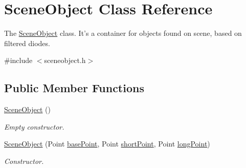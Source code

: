 \hypertarget{classSceneObject}{\section{\-Scene\-Object \-Class \-Reference}
\label{classSceneObject}
}


\-The \hyperlink{classSceneObject}{\-Scene\-Object} class. \-It's a container for objects found on scene, based on filtered diodes.  




{\ttfamily \#include $<$sceneobject.\-h$>$}

\subsection*{\-Public \-Member \-Functions}
\begin{DoxyCompactItemize}
\item 
\hypertarget{classSceneObject_a0d268d96d77dbeb45b07a6442e2f4d0d}{\hyperlink{classSceneObject_a0d268d96d77dbeb45b07a6442e2f4d0d}{\-Scene\-Object} ()}\label{classSceneObject_a0d268d96d77dbeb45b07a6442e2f4d0d}

\begin{DoxyCompactList}\small\item\em \-Empty constructor. \end{DoxyCompactList}\item 
\hyperlink{classSceneObject_a0bbd4971b6fd3b3ad2ea35ec14e6a617}{\-Scene\-Object} (\-Point \hyperlink{classSceneObject_a2b8c4779bd48231183257d0470c32f67}{base\-Point}, \-Point \hyperlink{classSceneObject_a11385bdb16c8fe6136484078bee1fb61}{short\-Point}, \-Point \hyperlink{classSceneObject_a78c848200dc2f5baa59393547e6f7259}{long\-Point})
\begin{DoxyCompactList}\small\item\em \-Constructor. \end{DoxyCompactList}\end{DoxyCompactItemize}
